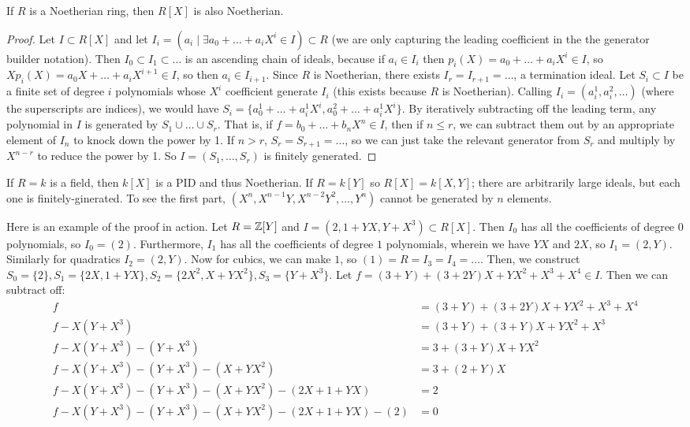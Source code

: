 \begin{theorem}[Hilbert]
    If $R$ is a Noetherian ring, then $R[X]$ is also Noetherian.
    \begin{proof}
        Let $I \subset R[X]$ and let $I_i = (a_i \mid \exists a_0 + \dots + a_i X^i \in I) \subset R$ (we are only capturing the leading coefficient in the
        the generator builder notation). Then $I_0 \subset I_1 \subset \dots$ is an ascending chain of ideals, because if $a_i \in I_i$ then $p_i(X) = a_0 + \dots + a_iX^i \in I$,
        so $Xp_i(X) =  a_0 X + \dots + a_iX^{i+1} \in I$, so then $a_i \in I_{i + 1}$. Since $R$ is Noetherian, there exists
        $I_r = I_{r + 1} = \dots$, a termination ideal. Let $S_i \subset I$ be a finite set of degree $i$ polynomials whose $X^i$ coefficient
        generate $I_i$ (this exists because $R$ is Noetherian). Calling $I_i = (a_i^1, a_i^2, \dots)$ (where the superscripts are indices), we would have
        $S_i = \{a_0^1 + \dots + a_i^1 X^i, a_0^2 + \dots + a_i^1 X^i\}$. By iteratively subtracting off the leading term, any polynomial in $I$
        is generated by $S_1 \cup \dots \cup S_r$. That is, if $f = b_0 + \dots + b_n X^n \in I$,
        then if $n \le r$, we can subtract them out by an appropriate element of $I_n$ to knock down the power by 1.
        If $n > r$, $S_r = S_{r + 1} = \dots$, so we can just take the relevant generator from $S_r$ and multiply by $X^{n - r}$
        to reduce the power by 1.
        So $I = (S_1, \dots, S_r)$ is finitely generated.
    \end{proof}
\end{theorem}
If $R=k$ is a field, then $k[X]$ is a PID and thus Noetherian. If $R = k[Y]$ so $R[X] = k[X, Y]$; there are arbitrarily large ideals,
but each one is finitely-ginerated. To see the first part, $(X^n, X^{n - 1}Y, X^{n - 2}Y^2 , \dots , Y^n)$ cannot be generated by $n$ elements.
\begin{example}
    Here is an example of the proof in action. Let $R = \operatorname{\mathbb{Z}}[Y]$ and $I = (2, 1 + YX, Y + X^3) \subset R[X]$.
    Then $I_0$ has all the coefficients of degree $0$ polynomials, so $I_0 = (2)$.
    Furthermore, $I_1$ has all the coefficients of degree $1$ polynomials, wherein we have $YX$ and $2X$,
    so $I_1 = (2, Y)$. Similarly for quadratics $I_2 = (2, Y)$. Now for cubics, we can make $1$, so $(1) = R = I_3 = I_4 = \dots$.
    Then, we construct $S_0 = \{2\}, S_1 = \{2X, 1+YX\}, S_2 = \{ 2X^2, X + YX^2 \}, S_3 = \{ Y + X^3 \}$.
    Let $f = (3 + Y) + (3 + 2Y) X + YX^2 + X^3 + X^4 \in I$. Then we can subtract off:
    \begin{align*}
        f &= (3 + Y) + (3 + 2Y) X + YX^2 + X^3 + X^4 \\
        f - X(Y+X^3) &= (3+Y) + (3+Y)X + YX^2 + X^3 \\
        f - X(Y + X^3) - (Y + X^3)&= 3 + (3+Y)X + YX^2 \\
        f - X(Y + X^3) - (Y + X^3) - (X + YX^2) &= 3 + (2+Y)X \\
        f - X(Y + X^3) - (Y + X^3) - (X + YX^2) - (2X + 1 + YX) &= 2 \\
        f - X(Y + X^3) - (Y + X^3) - (X + YX^2) - (2X + 1 + YX) - (2) &= 0
    \end{align*}
\end{example}

